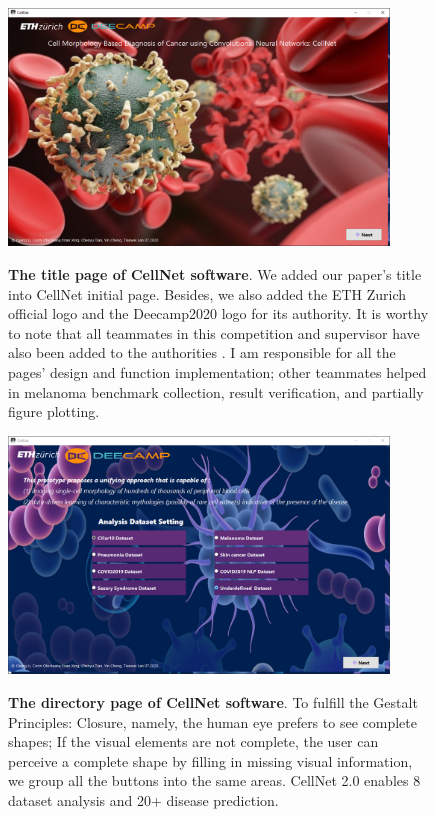 {\begin{figure}[t]
\begin{center}
\includegraphics[height=0.3\textheight,width=0.9\textwidth]{thesis-template-master/images/cellnet1page.PNG}
\label{fig:cellnet}
\end{center}
\caption{ \textbf{The title page of CellNet software}. We added our paper's title into CellNet initial page. Besides, we also added the ETH Zurich official logo and the Deecamp2020 logo for its authority. It is worthy to note that all teammates in this competition and  supervisor have also been added to the authorities . I am responsible for all the pages' design and function implementation; other teammates helped in melanoma benchmark collection, result verification, and partially figure plotting.}
\end{figure}


\begin{figure}[t]
\begin{center}
\includegraphics[height=0.3\textheight,width=0.9\textwidth]{thesis-template-master/images/cellnet2page.PNG}
\label{fig:cellnet}
\end{center}
\caption{ \textbf{The directory page of CellNet software}. To fulfill the Gestalt Principles: Closure, namely, the human eye prefers to see complete shapes; If the visual elements are not complete, the user can perceive a complete shape by filling in missing visual information, we group all the buttons into the same areas. CellNet 2.0 enables 8 dataset analysis and 20+ disease prediction.}
\end{figure}


}
